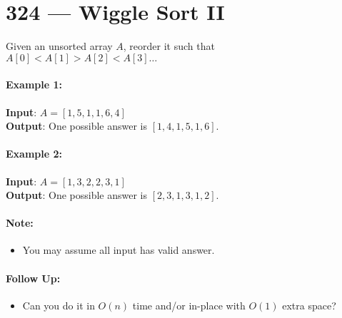 \section{324 --- Wiggle Sort II}
Given an unsorted array $ A $, reorder it such that $A[0] < A[1] > A[2] < A[3] \ldots$

\paragraph{Example 1:}

\begin{flushleft}
\textbf{Input}: $A = [1, 5, 1, 1, 6, 4]$
\\
\textbf{Output}: One possible answer is $ [1, 4, 1, 5, 1, 6] $.
\end{flushleft}

\paragraph{Example 2:}

\begin{flushleft}
\textbf{Input}: $A = [1, 3, 2, 2, 3, 1]$
\\
\textbf{Output}: One possible answer is $ [2, 3, 1, 3, 1, 2] $.

\end{flushleft}
\paragraph{Note:}
\begin{itemize}
\item You may assume all input has valid answer.
\end{itemize}

\paragraph{Follow Up:}
\begin{itemize}
\item Can you do it in $ O(n) $ time and/or in-place with $ O(1) $ extra space?
\end{itemize}

